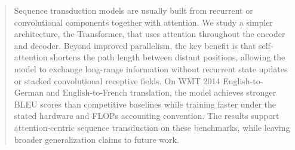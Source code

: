 \begin{abstract}
Sequence transduction models are usually built from recurrent or convolutional components together with attention. We study a simpler architecture, the Transformer, that uses attention throughout the encoder and decoder. Beyond improved parallelism, the key benefit is that self-attention shortens the path length between distant positions, allowing the model to exchange long-range information without recurrent state updates or stacked convolutional receptive fields. On WMT 2014 English-to-German and English-to-French translation, the model achieves stronger BLEU scores than competitive baselines while training faster under the stated hardware and FLOPs accounting convention. The results support attention-centric sequence transduction on these benchmarks, while leaving broader generalization claims to future work.
\end{abstract}
